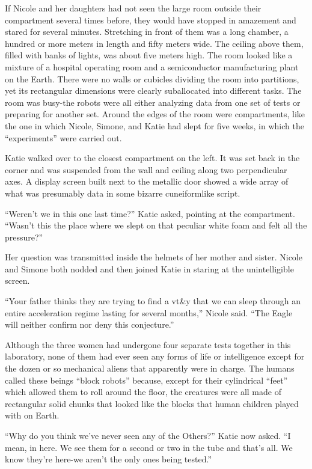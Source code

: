 \documentclass[]{article}
\begin{document}
{If Nicole and her daughters had not seen the large room outside their compartment several times before, they would have stopped in amazement and stared for several minutes. Stretching in front of them was a long chamber, a hundred or more meters in length and fifty meters wide. The ceiling above them, filled with banks of lights, was about five meters high. The room looked like a mixture of a hospital operating room and a semiconductor manufacturing plant on the Earth. There were no walls or cubicles dividing the room into partitions, yet its rectangular dimensions were clearly suballocated into different tasks. The room was busy-the robots were all either analyzing data from one set of tests or preparing for another set. Around the edges of the room were compartments, like the one in which Nicole, Simone, and Katie had slept for five weeks, in which the “experiments” were carried out.

Katie walked over to the closest compartment on the left. It was set back in the corner and was suspended from the wall and ceiling along two perpendicular axes. A display screen built next to the metallic door showed a wide array of what was presumably data in some bizarre cuneiformlike script.

“Weren’t we in this one last time?” Katie asked, pointing at the compartment. “Wasn’t this the place where we slept on that peculiar white foam and felt all the pressure?”

Her question was transmitted inside the helmets of her mother and sister. Nicole and Simone both nodded and then joined Katie in staring at the unintelligible screen.

“Your father thinks they are trying to find a vt\&y that we can sleep through an entire acceleration regime lasting for several months,” Nicole said. “The Eagle will neither confirm nor deny this conjecture.”

Although the three women had undergone four separate tests together in this laboratory, none of them had ever seen any forms of life or intelligence except for the dozen or so mechanical aliens that apparently were in charge. The humans called these beings “block robots” because, except for their cylindrical “feet” which allowed them to roll around the floor, the creatures were all made of rectangular solid chunks that looked like the blocks that human children played with on Earth.

“Why do you think we’ve never seen any of the Others?” Katie now asked. “I mean, in here. We see them for a second or two in the tube and that’s all. We know they’re here-we aren’t the only ones being tested.”

}
\end{document}
